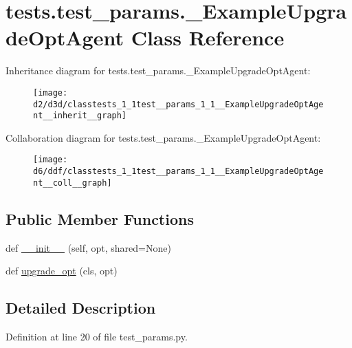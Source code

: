 \hypertarget{classtests_1_1test__params_1_1__ExampleUpgradeOptAgent}{}\section{tests.\+test\+\_\+params.\+\_\+\+Example\+Upgrade\+Opt\+Agent Class Reference}
\label{classtests_1_1test__params_1_1__ExampleUpgradeOptAgent}


Inheritance diagram for tests.\+test\+\_\+params.\+\_\+\+Example\+Upgrade\+Opt\+Agent\+:
\nopagebreak
\begin{figure}[H]
\begin{center}
\leavevmode
\texttt{[image: d2/d3d/classtests\_1\_1test\_\_params\_1\_1\_\_ExampleUpgradeOptAgent\_\_inherit\_\_graph]}
\end{center}
\end{figure}


Collaboration diagram for tests.\+test\+\_\+params.\+\_\+\+Example\+Upgrade\+Opt\+Agent\+:
\nopagebreak
\begin{figure}[H]
\begin{center}
\leavevmode
\texttt{[image: d6/ddf/classtests\_1\_1test\_\_params\_1\_1\_\_ExampleUpgradeOptAgent\_\_coll\_\_graph]}
\end{center}
\end{figure}
\subsection*{Public Member Functions}
\begin{DoxyCompactItemize}
\item 
def \hyperlink{classtests_1_1test__params_1_1__ExampleUpgradeOptAgent_acef7f1764706efba76b8f106e90b53cc}{\+\_\+\+\_\+init\+\_\+\+\_\+} (self, opt, shared=None)
\item 
def \hyperlink{classtests_1_1test__params_1_1__ExampleUpgradeOptAgent_ad842b65ef0ce493c7644622aae6e17dc}{upgrade\+\_\+opt} (cls, opt)
\end{DoxyCompactItemize}


\subsection{Detailed Description}


Definition at line 20 of file test\+\_\+params.\+py.



